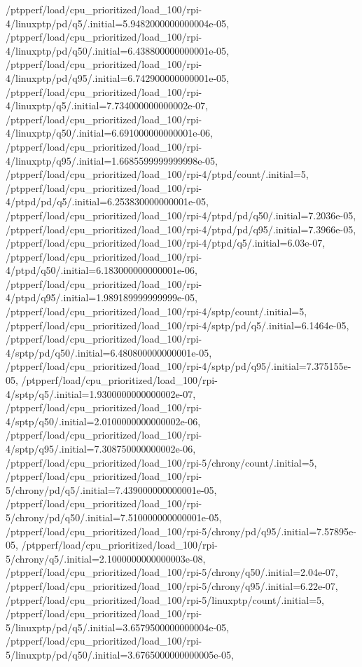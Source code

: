 {    /ptpperf/load/cpu_prioritized/load_100/rpi-4/linuxptp/pd/q5/.initial=5.9482000000000004e-05,
    /ptpperf/load/cpu_prioritized/load_100/rpi-4/linuxptp/pd/q50/.initial=6.438800000000001e-05,
    /ptpperf/load/cpu_prioritized/load_100/rpi-4/linuxptp/pd/q95/.initial=6.742900000000001e-05,
    /ptpperf/load/cpu_prioritized/load_100/rpi-4/linuxptp/q5/.initial=7.734000000000002e-07,
    /ptpperf/load/cpu_prioritized/load_100/rpi-4/linuxptp/q50/.initial=6.691000000000001e-06,
    /ptpperf/load/cpu_prioritized/load_100/rpi-4/linuxptp/q95/.initial=1.6685599999999998e-05,
    /ptpperf/load/cpu_prioritized/load_100/rpi-4/ptpd/count/.initial=5,
    /ptpperf/load/cpu_prioritized/load_100/rpi-4/ptpd/pd/q5/.initial=6.253830000000001e-05,
    /ptpperf/load/cpu_prioritized/load_100/rpi-4/ptpd/pd/q50/.initial=7.2036e-05,
    /ptpperf/load/cpu_prioritized/load_100/rpi-4/ptpd/pd/q95/.initial=7.3966e-05,
    /ptpperf/load/cpu_prioritized/load_100/rpi-4/ptpd/q5/.initial=6.03e-07,
    /ptpperf/load/cpu_prioritized/load_100/rpi-4/ptpd/q50/.initial=6.183000000000001e-06,
    /ptpperf/load/cpu_prioritized/load_100/rpi-4/ptpd/q95/.initial=1.989189999999999e-05,
    /ptpperf/load/cpu_prioritized/load_100/rpi-4/sptp/count/.initial=5,
    /ptpperf/load/cpu_prioritized/load_100/rpi-4/sptp/pd/q5/.initial=6.1464e-05,
    /ptpperf/load/cpu_prioritized/load_100/rpi-4/sptp/pd/q50/.initial=6.480800000000001e-05,
    /ptpperf/load/cpu_prioritized/load_100/rpi-4/sptp/pd/q95/.initial=7.375155e-05,
    /ptpperf/load/cpu_prioritized/load_100/rpi-4/sptp/q5/.initial=1.9300000000000002e-07,
    /ptpperf/load/cpu_prioritized/load_100/rpi-4/sptp/q50/.initial=2.0100000000000002e-06,
    /ptpperf/load/cpu_prioritized/load_100/rpi-4/sptp/q95/.initial=7.308750000000002e-06,
    /ptpperf/load/cpu_prioritized/load_100/rpi-5/chrony/count/.initial=5,
    /ptpperf/load/cpu_prioritized/load_100/rpi-5/chrony/pd/q5/.initial=7.439000000000001e-05,
    /ptpperf/load/cpu_prioritized/load_100/rpi-5/chrony/pd/q50/.initial=7.510000000000001e-05,
    /ptpperf/load/cpu_prioritized/load_100/rpi-5/chrony/pd/q95/.initial=7.57895e-05,
    /ptpperf/load/cpu_prioritized/load_100/rpi-5/chrony/q5/.initial=2.1000000000000003e-08,
    /ptpperf/load/cpu_prioritized/load_100/rpi-5/chrony/q50/.initial=2.04e-07,
    /ptpperf/load/cpu_prioritized/load_100/rpi-5/chrony/q95/.initial=6.22e-07,
    /ptpperf/load/cpu_prioritized/load_100/rpi-5/linuxptp/count/.initial=5,
    /ptpperf/load/cpu_prioritized/load_100/rpi-5/linuxptp/pd/q5/.initial=3.6579500000000004e-05,
    /ptpperf/load/cpu_prioritized/load_100/rpi-5/linuxptp/pd/q50/.initial=3.6765000000000005e-05,
}
